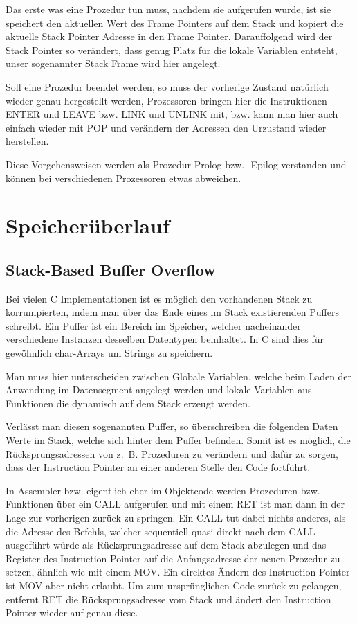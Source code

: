 \documentclass[12pt]{book}
\begin{document}
Das erste was eine Prozedur tun muss, nachdem sie aufgerufen wurde, ist sie
speichert den aktuellen Wert des Frame Pointers auf dem Stack und kopiert die
aktuelle Stack Pointer Adresse in den Frame Pointer. Darauffolgend wird der
Stack Pointer so verändert, dass genug Platz für die lokale Variablen entsteht,
unser sogenannter Stack Frame wird hier angelegt.

Soll eine Prozedur beendet werden, so muss der vorherige Zustand natürlich
wieder genau hergestellt werden, Prozessoren bringen hier die Instruktionen
ENTER und LEAVE bzw. LINK und UNLINK mit, bzw. kann man hier auch einfach
wieder mit POP und verändern der Adressen den Urzustand wieder herstellen.

Diese Vorgehensweisen werden als Prozedur-Prolog bzw. -Epilog verstanden und
können bei verschiedenen Prozessoren etwas abweichen.

\chapter{Speicherüberlauf}

\section{Stack-Based Buffer Overflow}

Bei vielen C Implementationen ist es möglich den vorhandenen Stack zu
korrumpierten, indem man über das Ende eines im Stack existierenden Puffers
schreibt. Ein Puffer ist ein Bereich im Speicher, welcher nacheinander
verschiedene Instanzen desselben Datentypen beinhaltet. In C sind dies für
gewöhnlich char-Arrays um Strings zu speichern.

Man muss hier unterscheiden zwischen Globale Variablen, welche beim Laden der
Anwendung im Datensegment angelegt werden und lokale Variablen aus Funktionen
die dynamisch auf dem Stack erzeugt werden.

Verlässt man diesen sogenannten Puffer, so überschreiben die folgenden Daten
Werte im Stack, welche sich hinter dem Puffer befinden. Somit ist es möglich,
die Rücksprungsadressen von z. B. Prozeduren zu verändern und dafür zu sorgen,
dass der Instruction Pointer an einer anderen Stelle den Code fortführt.

In Assembler bzw. eigentlich eher im Objektcode werden Prozeduren bzw.
Funktionen über ein CALL aufgerufen und mit einem RET ist man dann in der Lage
zur vorherigen zurück zu springen. Ein CALL tut dabei nichts anderes, als die
Adresse des Befehls, welcher sequentiell quasi direkt nach dem CALL ausgeführt
würde als Rücksprungsadresse auf dem Stack abzulegen und das Register des
Instruction Pointer auf die Anfangsadresse der neuen Prozedur zu setzen, ähnlich
wie mit einem MOV. Ein direktes Ändern des Instruction Pointer ist MOV aber
nicht erlaubt. Um zum ursprünglichen Code zurück zu gelangen, entfernt RET die
Rücksprungsadresse vom Stack und ändert den Instruction Pointer wieder auf genau
diese.
\end{document}
